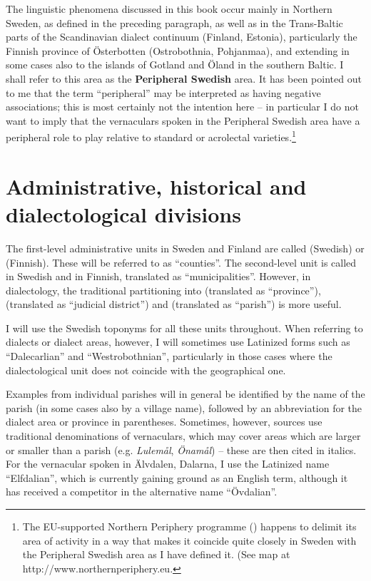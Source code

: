 The linguistic phenomena discussed in this book occur mainly in Northern Sweden, as defined in the preceding paragraph, as well as in the Trans-Baltic parts of the Scandinavian dialect continuum (Finland, Estonia), particularly the Finnish province of Österbotten (Ostrobothnia, Pohjanmaa), and extending in some cases also to the islands of Gotland and Öland in the southern Baltic. I shall refer to this area as the \textbf{Peripheral Swedish }area. It has been pointed out to me that the term “peripheral” may be interpreted as having negative associations; this is most certainly not the intention here – in particular I do not want to imply that the vernaculars spoken in the Peripheral Swedish area have a peripheral role to play relative to standard or acrolectal varieties.\footnote{ The EU-supported Northern Periphery programme () happens to delimit its area of activity in a way that makes it coincide quite closely in Sweden with the Peripheral Swedish area as I have defined it. (See map at http://www.northernperiphery.eu.} 

\section{ Administrative, historical and dialectological divisions}

The first-level administrative units in Sweden and Finland are called  (Swedish) or  (Finnish). These will be referred to as “counties”. The second-level unit is called  in Swedish and  in Finnish, translated as “municipalities”. However, in dialectology, the traditional partitioning into  (translated as “province”),  (translated as “judicial district”) and  (translated as “parish”) is more useful. 

I will use the Swedish toponyms for all these units throughout. When referring to dialects or dialect areas, however, I will sometimes use Latinized forms such as “Dalecarlian” and “Westrobothnian”, particularly in those cases where the dialectological unit does not coincide with the geographical one.

Examples from individual parishes will in general be identified by the name of the parish (in some cases also by a village name), followed by an abbreviation for the dialect area or province in parentheses. Sometimes, however, sources use traditional denominations of vernaculars, which may cover areas which are larger or smaller than a parish (e.g. \textit{Lulemål}, \textit{Önamål}) – these are then cited in italics. For the vernacular spoken in Älvdalen, Dalarna, I use the Latinized name “Elfdalian”, which is currently gaining ground as an English term, although it has received a competitor in the alternative name “Övdalian”.


